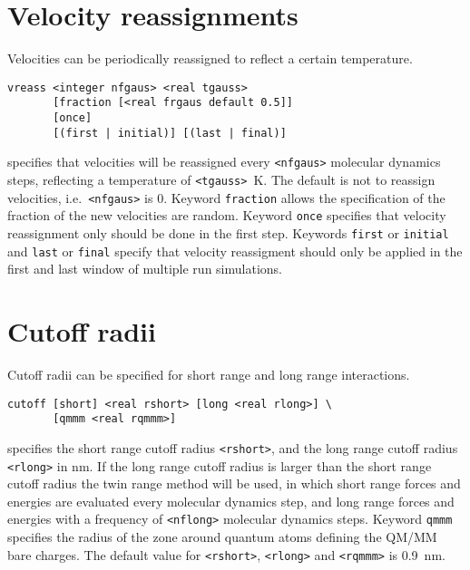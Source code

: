 \section{Velocity reassignments}
Velocities can be periodically reassigned to reflect a certain temperature.
\begin{description}
\item
\begin{verbatim}
vreass <integer nfgaus> <real tgauss>
       [fraction [<real frgaus default 0.5]]
       [once]
       [(first | initial)] [(last | final)]
\end{verbatim}
specifies that velocities will be reassigned every \verb+<nfgaus>+ molecular
dynamics steps, reflecting a temperature of \verb+<tgauss>+~K. The default
is not to reassign velocities, i.e.\ \verb+<nfgaus>+ is 0. Keyword 
\verb+fraction+ allows the specification of the fraction of the new
velocities are random. Keyword \verb+once+ specifies that velocity
reassignment only should be done in the first step. Keywords \verb+first+
or \verb+initial+ and \verb+last+ or \verb+final+ specify that
velocity reassigment should only be applied in the first and last
window of multiple run simulations.

\end{description}

\section{Cutoff radii}
Cutoff radii can be specified for short range and long range interactions.
\begin{description}
\item
\begin{verbatim}
cutoff [short] <real rshort> [long <real rlong>] \
       [qmmm <real rqmmm>]
\end{verbatim}
specifies the short range cutoff radius \verb+<rshort>+, and the long range
cutoff radius \verb+<rlong>+ in nm. If the long range cutoff radius
is larger than the short range cutoff radius the twin range method will
be used, in which short range forces and energies are evaluated every
molecular dynamics step, and long range forces and energies with a
frequency of \verb+<nflong>+ molecular dynamics steps. Keyword
\verb+qmmm+ specifies the radius of the zone around quantum atoms
defining the QM/MM bare charges.
The default value for \verb+<rshort>+, \verb+<rlong>+ and \verb+<rqmmm>+ 
is 0.9~nm.
\end{description}

